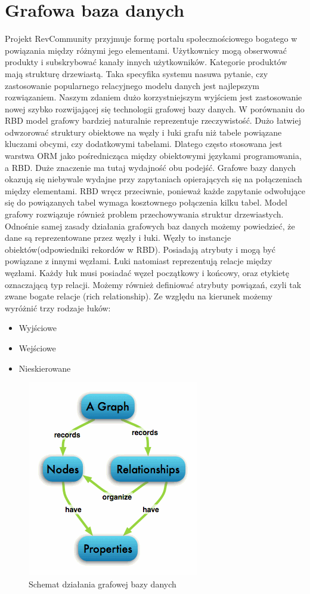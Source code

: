 \section{Grafowa baza danych}

Projekt RevCommunity przyjmuje formę portalu społecznościowego bogatego w powiązania między różnymi jego elementami. Użytkownicy mogą obserwować produkty i subskrybować kanały innych użytkowników. Kategorie produktów mają strukturę drzewiastą. Taka specyfika systemu nasuwa pytanie, czy zastosowanie popularnego relacyjnego modelu danych jest najlepszym rozwiązaniem. Naszym zdaniem dużo korzystniejszym wyjściem jest zastosowanie nowej szybko rozwijającej się technologii grafowej bazy danych. W porównaniu do RBD model grafowy bardziej naturalnie reprezentuje rzeczywistość. Dużo łatwiej odwzorować struktury obiektowe na węzły i łuki grafu niż tabele powiązane kluczami obcymi, czy dodatkowymi tabelami. Dlatego często stosowana jest warstwa ORM jako pośrednicząca między obiektowymi językami programowania, a RBD. Duże znaczenie ma tutaj wydajność obu podejść. Grafowe bazy danych okazują się niebywale wydajne przy zapytaniach opierających się na połączeniach między elementami. RBD wręcz przeciwnie, ponieważ każde zapytanie odwołujące się do powiązanych tabel wymaga kosztownego połączenia kilku tabel. Model grafowy rozwiązuje również problem przechowywania struktur drzewiastych.
Odnośnie samej zasady działania grafowych baz danych możemy powiedzieć, że dane są reprezentowane przez węzły i łuki. Węzły to instancje obiektów(odpowiedniki rekordów w RBD). Posiadają atrybuty i mogą być powiązane z innymi węzłami. Łuki natomiast reprezentują relacje między węzłami. Każdy łuk musi posiadać węzeł początkowy i końcowy, oraz etykietę oznaczającą typ relacji. Możemy również definiować atrybuty powiązań, czyli tak zwane bogate relacje (rich relationship). Ze względu na kierunek możemy wyróżnić trzy rodzaje łuków:
\begin{itemize}
\item Wyjściowe
\item Wejściowe
\item Nieskierowane
\end{itemize}


\begin{figure}[h]
	\centering
	\includegraphics[scale=1]{images/graphdb.png}
	\caption{Schemat działania grafowej bazy danych}
\end{figure}

